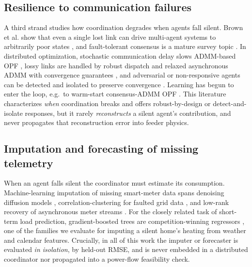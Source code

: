 \subsection{Resilience to communication failures}
A third strand studies how coordination degrades when agents fall silent. Brown
et al. show that even a single lost link can drive multi-agent systems to
arbitrarily poor states \cite{Brown2017}, and fault-tolerant consensus is a
mature survey topic \cite{GaoHe2022}. In distributed optimization, stochastic
communication delay slows ADMM-based OPF \cite{Xu2019}, lossy links are handled
by robust dispatch \cite{Wu2017} and relaxed asynchronous ADMM with convergence
guarantees \cite{Bastianello2021}, and adversarial or non-responsive agents can
be detected and isolated to preserve convergence \cite{Gusrialdi2023}. Learning
has begun to enter the loop, e.g.\ to warm-start consensus-ADMM OPF
\cite{Lee2026}. This literature characterizes \emph{when} coordination breaks and
offers robust-by-design or detect-and-isolate responses, but it rarely
\emph{reconstructs} a silent agent's contribution, and never propagates that
reconstruction error into feeder physics.

\subsection{Imputation and forecasting of missing telemetry}
When an agent falls silent the coordinator must estimate its consumption.
Machine-learning imputation of missing smart-meter data spans denoising diffusion
models \cite{Buwaneswaran2026}, correlation-clustering for faulted grid data
\cite{RazaviFar2020}, and low-rank recovery of asynchronous meter streams
\cite{Yuan2021}. For the closely related task of short-term load prediction,
gradient-boosted trees are competition-winning regressors
\cite{BenTaieb2014,Lloyd2014}, one of the families we evaluate
\cite{ke2017lightgbm} for imputing a silent home's heating from weather and
calendar features. Crucially, in all of this work the imputer or forecaster is evaluated
\emph{in isolation}, by held-out RMSE, and is never embedded in a
distributed coordinator nor propagated into a power-flow feasibility check.

